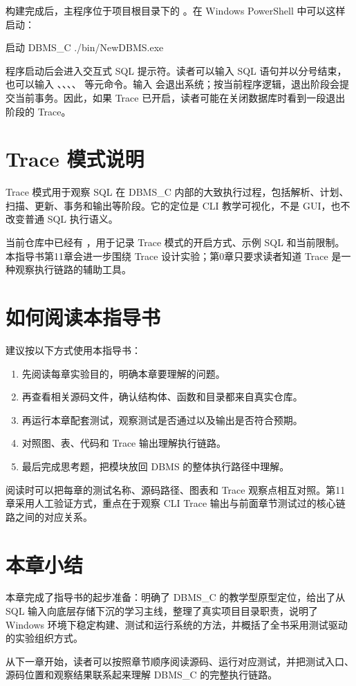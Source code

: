 构建完成后，主程序位于项目根目录下的 。在 Windows PowerShell 中可以这样启动：

\begin{dbcode}[listing options={language=bash,numbers=none}]{启动 DBMS\_C}
./bin/NewDBMS.exe
\end{dbcode}

程序启动后会进入交互式 SQL 提示符。读者可以输入 SQL 语句并以分号结束，也可以输入 、、、、 等元命令。输入  会退出系统；按当前程序逻辑，退出阶段会提交当前事务。因此，如果 Trace 已开启，读者可能在关闭数据库时看到一段退出阶段的  Trace。

\section{Trace 模式说明}
\label{sec:intro-trace}

Trace 模式用于观察 SQL 在 DBMS\_C 内部的大致执行过程，包括解析、计划、扫描、更新、事务和输出等阶段。它的定位是 CLI 教学可视化，不是 GUI，也不改变普通 SQL 执行语义。

当前仓库中已经有 ，用于记录 Trace 模式的开启方式、示例 SQL 和当前限制。本指导书第11章会进一步围绕 Trace 设计实验；第0章只要求读者知道 Trace 是一种观察执行链路的辅助工具。

\section{如何阅读本指导书}
\label{sec:intro-how-to-read}

建议按以下方式使用本指导书：

\begin{enumerate}
  \item 先阅读每章实验目的，明确本章要理解的问题。
  \item 再查看相关源码文件，确认结构体、函数和目录都来自真实仓库。
  \item 再运行本章配套测试，观察测试是否通过以及输出是否符合预期。
  \item 对照图、表、代码和 Trace 输出理解执行链路。
  \item 最后完成思考题，把模块放回 DBMS 的整体执行路径中理解。
\end{enumerate}

阅读时可以把每章的测试名称、源码路径、图表和 Trace 观察点相互对照。第11章采用人工验证方式，重点在于观察 CLI Trace 输出与前面章节测试过的核心链路之间的对应关系。

\section{本章小结}
\label{sec:intro-summary}

本章完成了指导书的起步准备：明确了 DBMS\_C 的教学型原型定位，给出了从 SQL 输入向底层存储下沉的学习主线，整理了真实项目目录职责，说明了 Windows 环境下稳定构建、测试和运行系统的方法，并概括了全书采用测试驱动的实验组织方式。

从下一章开始，读者可以按照章节顺序阅读源码、运行对应测试，并把测试入口、源码位置和观察结果联系起来理解 DBMS\_C 的完整执行链路。
